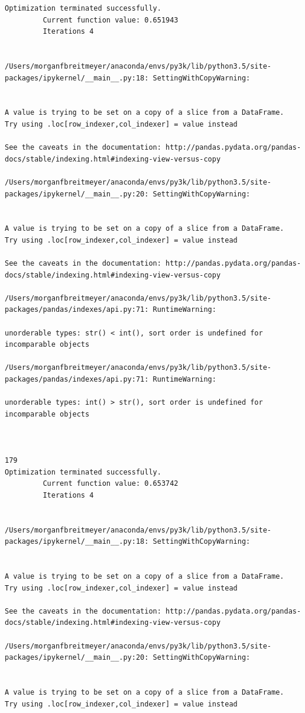 \begin{lstlisting}
Optimization terminated successfully.
         Current function value: 0.651943
         Iterations 4


/Users/morganfbreitmeyer/anaconda/envs/py3k/lib/python3.5/site-packages/ipykernel/__main__.py:18: SettingWithCopyWarning:


A value is trying to be set on a copy of a slice from a DataFrame.
Try using .loc[row_indexer,col_indexer] = value instead

See the caveats in the documentation: http://pandas.pydata.org/pandas-docs/stable/indexing.html#indexing-view-versus-copy

/Users/morganfbreitmeyer/anaconda/envs/py3k/lib/python3.5/site-packages/ipykernel/__main__.py:20: SettingWithCopyWarning:


A value is trying to be set on a copy of a slice from a DataFrame.
Try using .loc[row_indexer,col_indexer] = value instead

See the caveats in the documentation: http://pandas.pydata.org/pandas-docs/stable/indexing.html#indexing-view-versus-copy

/Users/morganfbreitmeyer/anaconda/envs/py3k/lib/python3.5/site-packages/pandas/indexes/api.py:71: RuntimeWarning:

unorderable types: str() < int(), sort order is undefined for incomparable objects

/Users/morganfbreitmeyer/anaconda/envs/py3k/lib/python3.5/site-packages/pandas/indexes/api.py:71: RuntimeWarning:

unorderable types: int() > str(), sort order is undefined for incomparable objects



179
Optimization terminated successfully.
         Current function value: 0.653742
         Iterations 4


/Users/morganfbreitmeyer/anaconda/envs/py3k/lib/python3.5/site-packages/ipykernel/__main__.py:18: SettingWithCopyWarning:


A value is trying to be set on a copy of a slice from a DataFrame.
Try using .loc[row_indexer,col_indexer] = value instead

See the caveats in the documentation: http://pandas.pydata.org/pandas-docs/stable/indexing.html#indexing-view-versus-copy

/Users/morganfbreitmeyer/anaconda/envs/py3k/lib/python3.5/site-packages/ipykernel/__main__.py:20: SettingWithCopyWarning:


A value is trying to be set on a copy of a slice from a DataFrame.
Try using .loc[row_indexer,col_indexer] = value instead


\end{lstlisting}
